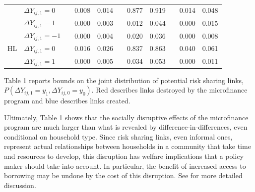 \documentclass[12pt]{article}
\theoremstyle{definition}
\begin{document}
\begin{table}[htbp]
\begin{tabular}{clrcccccccc}
	& $\Delta Y_{ij,1} = 0$ &       & \textcolor[rgb]{ 0,  .439,  .753}{0.008} & \textcolor[rgb]{ 0,  .439,  .753}{0.014} &       & 0.877 & 0.919 &       & \textcolor[rgb]{ .753,  0,  0}{0.014} & \textcolor[rgb]{ .753,  0,  0}{0.048} \\
	& $\Delta Y_{ij,1} = 1$ &       & \textcolor[rgb]{ 0,  .439,  .753}{0.000} & \textcolor[rgb]{ 0,  .439,  .753}{0.003} &       & \textcolor[rgb]{ 0,  .439,  .753}{0.012} & \textcolor[rgb]{ 0,  .439,  .753}{0.044} &       & 0.000 & 0.015 \\
	\midrule
	\multirow{3}[1]{*}{HL} & $\Delta Y_{ij,1} = -1$ &       & 0.000 & 0.004 &       & \textcolor[rgb]{ .753,  0,  0}{0.020} & \textcolor[rgb]{ .753,  0,  0}{0.036} &       & \textcolor[rgb]{ .753,  0,  0}{0.000} & \textcolor[rgb]{ .753,  0,  0}{0.008} \\
	& $\Delta Y_{ij,1} = 0$ &       & \textcolor[rgb]{ 0,  .439,  .753}{0.016} & \textcolor[rgb]{ 0,  .439,  .753}{0.026} &       & 0.837 & 0.863 &       & \textcolor[rgb]{ .753,  0,  0}{0.040} & \textcolor[rgb]{ .753,  0,  0}{0.061} \\
	& $\Delta Y_{ij,1} = 1$ &       & \textcolor[rgb]{ 0,  .439,  .753}{0.000} & \textcolor[rgb]{ 0,  .439,  .753}{0.005} &       & \textcolor[rgb]{ 0,  .439,  .753}{0.034} & \textcolor[rgb]{ 0,  .439,  .753}{0.053} &       & 0.000 & 0.011 \\ \hline\hline
\end{tabular}%
	\begin{flushleft} \footnotesize \linespread{.75} Table 1 reports bounds on the joint distribution of potential risk sharing links, $P(\Delta Y_{ij,1} = y_1, \Delta Y_{ij,0} = y_0)$. \textcolor[rgb]{ .753,  0,  0}{Red} describes links destroyed by the microfinance program and \textcolor[rgb]{ 0,  .439,  .753}{blue} describes links created.  \normalsize \end{flushleft}
\end{table}%

Ultimately, Table 1 shows that the socially disruptive effects of the microfinance program are much larger than what is revealed by difference-in-differences, even conditional on household type. Since risk sharing links, even informal ones, represent actual relationships between households in a community that take time and resources to develop, this disruption has welfare implications that a policy maker should take into account. In particular, the benefit of increased access to borrowing may be undone by the cost of this disruption. See \cite{banerjee2021changes,jackson2021inequality} for more detailed discussion.   
\end{document}
